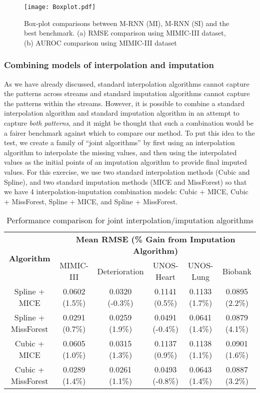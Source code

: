 \documentclass{article}
\begin{document}
\begin{figure}[t!]
	\centering
	\texttt{[image: Boxplot.pdf]}
	\caption{Box-plot comparisons between M-RNN (MI), M-RNN (SI) and the best benchmark. (a) RMSE comparison using MIMIC-III dataset, (b) AUROC comparison using MIMIC-III dataset}
	\label{fig:boxplot}
\end{figure}

\subsubsection{Combining models of interpolation and imputation}
As we have already discussed, standard interpolation algorithms cannot capture the patterns across streams and standard imputation algorithms  cannot  capture the patterns within the streams.  However, it is possible to  combine a standard interpolation algorithm and standard imputation algorithm in an attempt to capture {\em both patterns}, and it might be thought that such a combination would be a fairer benchmark against which to compare our method.   To put this idea to the test, we create a family of ``joint algorithms'' by first using an interpolation algorithm to interpolate the missing values, and then using the interpolated values as the initial points of an imputation algorithm to provide final imputed values. For this exercise, we use two standard interpolation methods (Cubic and Spline), and two standard imputation methods (MICE and MissForest) so that we have 4 interpolation-imputation combination models: Cubic + MICE, Cubic + MissForest, Spline + MICE, and Spline + MissForest. 

\begin{table*}[t!]
	\caption{Performance comparison for joint interpolation/imputation algorithms}
	\label{tab:Sup_Imputation}
	\centering
	\small
	\begin{tabular}{c|c|c|c|c|c}
		\toprule
		\multirow{2}{*}{\textbf{Algorithm}} &\multicolumn{5}{c}{\textbf{Mean RMSE (\% Gain from Imputation Algorithm)}}  \\
		\cmidrule{2-6}
		 & MIMIC-III & Deterioration & UNOS-Heart & UNOS-Lung & Biobank \\
		\midrule
		Spline + MICE  & 0.0602 (1.5\%)  &  0.0320 (-0.3\%) & 0.1141 (0.5\%)  & 0.1133 (1.7\%)  & 0.0895 (2.2\%)\\
		Spline + MissForest   &0.0291 (0.7\%)  & 0.0259 (1.9\%)  & 0.0491 (-0.4\%)  & 0.0641 (1.4\%) & 0.0879 (4.1\%)\\
		Cubic + MICE & 0.0605 (1.0\%)&  0.0315 (1.3\%)  &0.1137 (0.9\%)  & 0.1138 (1.1\%) & 0.0901 (1.6\%) \\
		Cubic + MissForest & 0.0289 (1.4\%) & 0.0261 (1.1\%)   &0.0493 (-0.8\%)  & 0.0643 (1.4\%) & 0.0887 (3.2\%)  \\	\bottomrule
	\end{tabular}
\end{table*}
\end{document}
